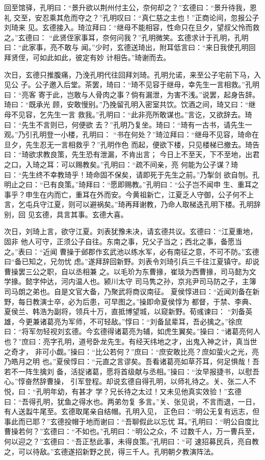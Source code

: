 回至馆驿，孔明曰：“景升欲以荆州付主公，奈何却之？”玄德曰：“景升待我，恩礼
交至，安忍乘其危而夺之？”孔明叹曰：“真仁慈之主也！”正商论间，忽报公子刘琦来
见。玄德接入。琦泣拜曰：“继母不能相容，性命只在旦夕，望叔父怜而救之。”玄德曰：
“此贤侄家事耳，奈何问我？”孔明微笑。玄德求计于孔明，孔明曰：“此家事，亮不敢与
闻。”少时，玄德送琦出，附耳低言曰：“来日我使孔明回拜贤侄，可如此如此，彼定有妙
计相告。”琦谢而去。

次日，玄德只推腹痛，乃浼孔明代往回拜刘琦。孔明允诺，来至公子宅前下马，入见公
子。公子邀入后堂。茶罢，琦曰：“琦不见容于继母，幸先生一言相救。”孔明曰：“亮客
寄于此，岂敢与人骨肉之事？倘有漏泄，为害不浅。”说罢，起身告辞。琦曰：“既承光
顾，安敢慢别。”乃挽留孔明入密室共饮。饮酒之间，琦又曰：“继母不见容，乞先生一言
救我。”孔明曰：“此非亮所敢谋也。”言讫，又欲辞去。琦曰：“先生不言则已，何便欲
去？”孔明乃复坐。琦曰：“琦有一古书，请先生一观。”乃引孔明登一小楼，孔明曰：
“书在何处？”琦泣拜曰：“继母不见容，琦命在旦夕，先生忍无一言相救乎？”孔明作色
而起，便欲下楼，只见楼梯已撤去。琦告曰：“琦欲求教良策，先生恐有泄漏，不肯出言；
今日上不至天，下不至地，出君之口，入琦之耳：可以赐教矣。”孔明曰：“疏不间亲，亮
何能为公子谋？琦曰：“先生终不幸教琦乎！琦命固不保矣，请即死于先生之前。”乃掣剑
欲自刎。孔明止之曰：“已有良策。”琦拜曰：“愿即赐教。”孔明曰：“公子岂不闻申
生、重耳之事乎？申生在内而亡，重耳在外而安。今黄祖新亡，江夏乏人守御，公子何不上
言，乞屯兵守江夏，则可以避祸矣。”琦再拜谢教，乃命人取梯迭孔明下楼。孔明辞别，回
见玄德，具言其事。玄德大喜。

次日，刘琦上言，欲守江夏。刘表犹豫未决，请玄德共议。玄德曰：“江夏重地，固非
他人可守，正须公子自往。东南之事，兄父子当之；西北之事，备愿当之。”表曰：“近闻
曹操于邺郡作玄武池以练水军，必有南征之意，不可不防。”玄德曰“备已知之，兄勿忧
虑。”遂拜辞回新野。刘表令刘琦引兵三千往江夏镇守。却说曹操罢三公之职，自以丞相兼
之。以毛玠为东曹掾，崔琰为西曹掾，司马懿为文学掾。懿字仲达，河内温人也。颍川太守
司马隽之孙，京兆尹司马防之子，主簿司马朗之弟也。自是文官大备，乃聚武将商议南征。
夏侯惇进曰：“近闻刘备在新野，每日教演士卒，必为后患，可早图之。”操即命夏侯惇为
都督，于禁、李典、夏侯兰、韩浩为副将，领兵十万，直抵博望城，以窥新野。荀彧谏曰：
“刘备英雄，今更兼诸葛亮为军师，不可轻敌。”惇曰：“刘备鼠辈耳，吾必擒之。”徐庶
曰：“将军勿轻视刘玄德。今玄德得诸葛亮为辅，如虎生翼矣。”操曰：“诸葛亮何人
也？”庶曰：亮字孔明，道号卧龙先生。有经天纬地之才，出鬼入神之计，真当世之奇才，
非可小觑。”操曰：“比公若何？”庶曰：“庶安敢比亮？庶如萤火之光，亮乃皓月之明
也。”夏侯惇曰：“元直之言谬矣。吾看诸葛亮如草芥耳，何足惧哉！吾若不一阵生擒刘
备，活捉诸葛，愿将首级献与丞相。”操曰：“汝早报捷书，以慰吾心。”惇奋然辞曹操，
引军登程。却说玄德自得孔明，以师礼待之。关、张二人不悦，曰：“孔明年幼，有甚才
学？兄长待之太过！又未见他真实效验！”玄德曰：“吾得孔明，犹鱼之得水也。两弟勿复
多言。”关、张见说，不言而退，一日，有人送蠫牛尾至。玄德取尾亲自结帽。孔明入见，
正色曰：“明公无复有远志，但事此而已耶？”玄德投帽于地而谢曰：“吾聊假此以忘忧
耳。”孔明曰：“明公自度比曹操若何？”玄德曰：“不如也。”孔明曰：“明公之众，不
过数千人，万一曹兵至，何以迎之？”玄德曰：“吾正愁此事，未得良策。”孔明曰：“可
速招募民兵，亮自教之，可以待敌。”玄德遂招新野之民，得三千人。孔明朝夕教演阵法。

